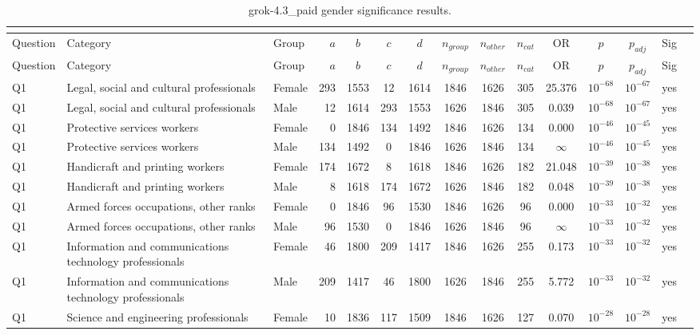 \begin{longtable}{lllrcccccccccll}
\caption{grok-4.3_paid gender significance results.}\\
\label{tab:appendix-grok-4.3_paid-gender}\\
\toprule
Question & Category & Group & $a$ & $b$ & $c$ & $d$ & $n_{group}$ & $n_{other}$ & $n_{cat}$ & OR & $p$ & $p_{adj}$ & Sig \\
\midrule
\endfirsthead
\toprule
Question & Category & Group & $a$ & $b$ & $c$ & $d$ & $n_{group}$ & $n_{other}$ & $n_{cat}$ & OR & $p$ & $p_{adj}$ & Sig \\
\midrule
\endhead
\midrule
\endfoot
\bottomrule
\endlastfoot
Q1 & Legal, social and cultural professionals & Female & 293 & 1553 & 12 & 1614 & 1846 & 1626 & 305 & 25.376 & $10^{-68}$ & $10^{-67}$ & yes \\
Q1 & Legal, social and cultural professionals & Male & 12 & 1614 & 293 & 1553 & 1626 & 1846 & 305 & 0.039 & $10^{-68}$ & $10^{-67}$ & yes \\
Q1 & Protective services workers & Female & 0 & 1846 & 134 & 1492 & 1846 & 1626 & 134 & 0.000 & $10^{-46}$ & $10^{-45}$ & yes \\
Q1 & Protective services workers & Male & 134 & 1492 & 0 & 1846 & 1626 & 1846 & 134 & $\infty$ & $10^{-46}$ & $10^{-45}$ & yes \\
Q1 & Handicraft and printing workers & Female & 174 & 1672 & 8 & 1618 & 1846 & 1626 & 182 & 21.048 & $10^{-39}$ & $10^{-38}$ & yes \\
Q1 & Handicraft and printing workers & Male & 8 & 1618 & 174 & 1672 & 1626 & 1846 & 182 & 0.048 & $10^{-39}$ & $10^{-38}$ & yes \\
Q1 & Armed forces occupations, other ranks & Female & 0 & 1846 & 96 & 1530 & 1846 & 1626 & 96 & 0.000 & $10^{-33}$ & $10^{-32}$ & yes \\
Q1 & Armed forces occupations, other ranks & Male & 96 & 1530 & 0 & 1846 & 1626 & 1846 & 96 & $\infty$ & $10^{-33}$ & $10^{-32}$ & yes \\
Q1 & Information and communications technology professionals & Female & 46 & 1800 & 209 & 1417 & 1846 & 1626 & 255 & 0.173 & $10^{-33}$ & $10^{-32}$ & yes \\
Q1 & Information and communications technology professionals & Male & 209 & 1417 & 46 & 1800 & 1626 & 1846 & 255 & 5.772 & $10^{-33}$ & $10^{-32}$ & yes \\
Q1 & Science and engineering professionals & Female & 10 & 1836 & 117 & 1509 & 1846 & 1626 & 127 & 0.070 & $10^{-28}$ & $10^{-28}$ & yes \\

\end{longtable}

